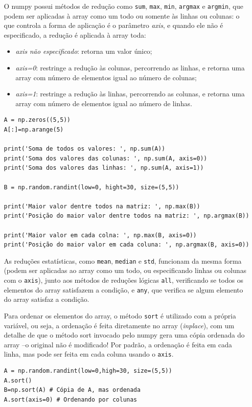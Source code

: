 \documentclass[../numerical_methods.tex]{subfiles}
\begin{document}
O numpy possui métodos de redução como \texttt{sum}, \texttt{max}, \texttt{min}, \texttt{argmax} e \texttt{argmin}, que podem ser aplicadas à array como um todo ou somente às linhas ou colunas: o que controla a forma de aplicação é o parâmetro \textit{axis}, e quando ele não é especificado, a redução é aplicada à array toda:
\begin{itemize}
	\item \textit{axis não especificado}: retorna um valor único;
	\item \textit{axis=0}: restringe a redução às colunas, percorrendo as linhas, e retorna uma array com número de elementos igual ao número de colunas;
	\item \textit{axis=1}: restringe a redução às linhas, percorrendo as colunas, e retorna uma array com número de elementos igual ao número de linhas.
\end{itemize}
\begin{verbatim}
A = np.zeros((5,5))
A[:]=np.arange(5)

print('Soma de todos os valores: ', np.sum(A))
print('Soma dos valores das colunas: ', np.sum(A, axis=0))
print('Soma dos valores das linhas: ', np.sum(A, axis=1))

B = np.random.randint(low=0, hight=30, size=(5,5))

print('Maior valor dentre todos na matriz: ', np.max(B))
print('Posição do maior valor dentre todos na matriz: ', np.argmax(B))

print('Maior valor em cada colna: ', np.max(B, axis=0))
print('Posição do maior valor em cada coluna: ', np.argmax(B, axis=0))
\end{verbatim}
As reduções estatísticas, como \texttt{mean}, \texttt{median} e \texttt{std}, funcionam da mesma forma (podem ser aplicadas ao array como um todo, ou especificando linhas ou colunas com o \texttt{axis}), junto aos métodos de reduções lógicas \texttt{all}, verificando se todos os elementos do array satisfazem a condição, e \texttt{any}, que verifica se algum elemento do array satisfaz a condição.

Para ordenar os elementos do array, o método \texttt{sort} é utilizado com a própria variável, ou seja, a ordenação é feita diretamente no array (\textit{inplace}), com um detalhe de que o método sort invocado pelo numpy gera uma cópia ordenada do array --o original não é modificado! Por padrão, a ordenação é feita em cada linha, mas pode ser feita em cada coluna usando o \texttt{axis}.
\begin{verbatim}
A = np.random.randint(low=0,high=30, size=(5,5))
A.sort()
B=np.sort(A) # Cópia de A, mas ordenada 
A.sort(axis=0) # Ordenando por colunas
\end{verbatim}
\end{document}
